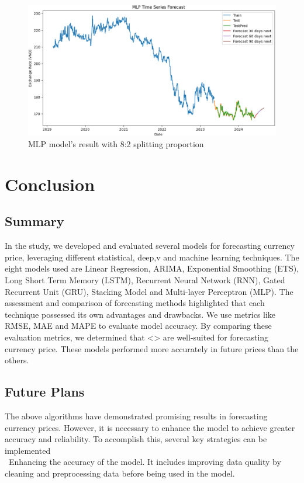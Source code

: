 \documentclass{ieeeojies}
\begin{document}
\begin{figure}[H]
  \centering
  \begin{minipage}{0.8\linewidth}
    \centering
    \includegraphics[width=\linewidth]{MLP/mlp_jpy_82.png}
    \caption{MLP model's result with 8:2 splitting proportion}
    \label{fig33}
  \end{minipage}
\end{figure}

\section{Conclusion}
\subsection{Summary}
In the study, we developed and evaluated several models for forecasting currency price, leveraging different statistical, deep,v and machine learning techniques. The eight models used are Linear Regression, ARIMA, Exponential Smoothing (ETS), Long Short Term Memory (LSTM), Recurrent Neural Network (RNN), Gated
Recurrent Unit (GRU), Stacking Model and Multi-layer Perceptron (MLP). The assessment and comparison of forecasting methods highlighted that each technique possessed its own advantages and drawbacks. We use metrics like RMSE, MAE and MAPE to evaluate model accuracy. By comparing these evaluation metrics, we determined that <> are well-suited for forecasting currency price. These models performed more accurately in future prices than the others. 
\subsection{Future Plans}
The above algorithms have demonstrated promising results in forecasting currency prices. However, it is necessary to enhance the model to achieve greater accuracy and reliability. To accomplish this, several key strategies can be implemented \\
\indent\textbullet\ Enhancing the accuracy of the model. It includes improving data quality by cleaning and preprocessing data before being used in the model.\\
\end{document}
